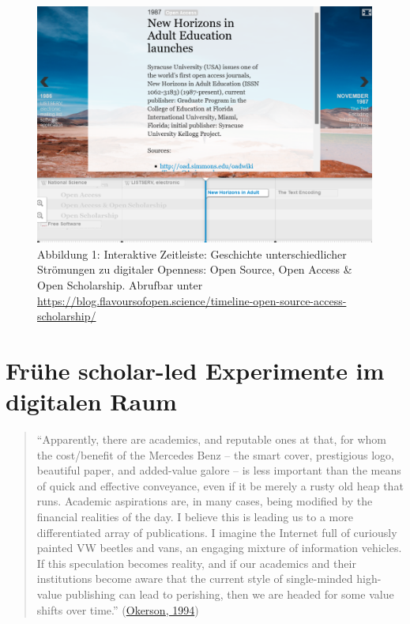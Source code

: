 \documentclass[a4paper,
fontsize=11pt,
oneside,
numbers=noperiodatend,
parskip=half-,
bibliography=totoc,
final
]{scrartcl}
\begin{document}
\begin{figure}
\centering
\includegraphics[width=.9\textwidth]{img/abb1.png}
\caption{Abbildung 1: Interaktive Zeitleiste: Geschichte
unterschiedlicher Strömungen zu digitaler Openness: Open Source, Open
Access \& Open Scholarship. Abrufbar unter
\url{https://blog.flavoursofopen.science/timeline-open-source-access-scholarship/}}
\end{figure}

\pagebreak

\hypertarget{fruxfche-scholar-led-experimente-im-digitalen-raum}{%
\section{Frühe scholar-led Experimente im digitalen
Raum}\label{fruxfche-scholar-led-experimente-im-digitalen-raum}}

\begin{quote}
\enquote{Apparently, there are academics, and reputable ones at that,
for whom the cost/benefit of the Mercedes Benz -- the smart cover,
prestigious logo, beautiful paper, and added-value galore -- is less
important than the means of quick and effective conveyance, even if it
be merely a rusty old heap that runs. Academic aspirations are, in many
cases, being modified by the financial realities of the day. I believe
this is leading us to a more differentiated array of publications. I
imagine the Internet full of curiously painted VW beetles and vans, an
engaging mixture of information vehicles. If this speculation becomes
reality, and if our academics and their institutions become aware that
the current style of single-minded high-value publishing can lead to
perishing, then we are headed for some value shifts over time.}
(\href{https://doi.org/10.7202/1064955ar}{Okerson, 1994})
\end{quote}
\end{document}
